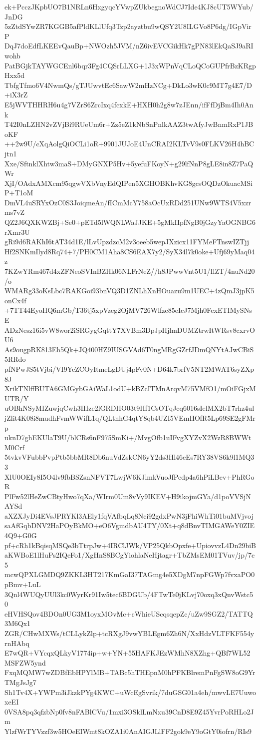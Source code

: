 ek+PcczJKpbUO7B1NRLn6HxgyqcYVwpZUkbegnoWdCJ7Ide4KJ8cUT5WYub/JnDG
5zZtdSYwZR7KGGB5afPldKLlUfq3Tzp2ayztbu9wQSY2U8ILGVo8P6dg/IGpVirP
DqJ7doEdfLKEEvQauBp+NWOzh5JVM/nZ6ivEVCGikHk7gPN83lEkQaSJ9aRIwohb
PatBGjkTAYWGCEnl6bqr3Fg4CQSrLLXG+1J3xWPnVqCLoQCoGUPfrBzKRgpHxx5d
TbfgTfmo6V4NwmQs/gTJUwvtEc6SawW2mHzNCg+DkLo3wK0c9MT7g4E7/D+iX3rZ
E5jWVTHHRH6u4g7VZrS6ZrcIxq4fcxkE+HXH0h2g8w7zJEnn/ifFfDjBm4Ih0Ank
T42I0nLZHN2vZVjBi9RUeUm6r+Zz5eZ1kNbSnPnlkAAZ3twAfyJwBnmRxP1JBoKF
++2w9U/cXqAolgQiOCLi1oR+9901JUJoE4UnCRAI2KLTvV9s0FLKV26H4hBCjtn1
Xxe/SftnklXhtw3maS+DMyGNXP5Hv+5yefuFKoyN+g29lfNnP8gLE8in8Z7PaQWr
XjI/OAdxAMXcm95qgwVXbVnyEdQIPen5XGHOBKhvKG8gcsOQDzOkuacMSiP+T1oM
DmVL4uSRYxOzC0S3JoiqmeAn/fICmMcY758aOcUxRDd251UNw9WTS4V5xzrms7vZ
QZ2J6QXKWZBj+Se0+pETd5lWQNLWaJJKE+5gMkIIpfNgB0jGzyYaOGNBG6rXmr3U
gRi9d6RAKhI6tAT34d1E/lLvUpzdzcM2v3oeeb5wepJXzicx11FYMeFTnswIZTjj
Hf2SNKmIlyd8Rq74+7/PH0CM1Aha8CS6EAX7y2/SyX34l7k0oke+Ufj69yMaq04z
7KZwYRm467d4xZFNeoSVInBZHk06NLFrNeZ//h8JPwwVnt5U1/IlZT/4nuNd20/o
WMARg33oKsLbc7RAKGoi93bnVQ3D1ZNLhXnHOuazu9m1UEC+4zQmJ3jpK5onCx4f
+7TT44EyoHQ6mGb/T36tj5xpVzeg2OjMV726Wlfze85eIcJ7Mjh0FexETIMySNsE
ADzNesz16i5vW8wor2iSRGygGqttY7XVBm3DpJpHjlmDUMZtrwItWRsv8cxrvOU6
As9ougpRK813Eh5Qk+JQ400HZ9IUSGVAd6T0ngMRgGZrfJDmQNYtAJwCBiS5RRdo
pfNPwJS5tVjbi/VI9YcZCOyItmeLgDUj4pFv0N+D64k7brfV5NT2MWAT6syZXp8J
XrikTNlffBUTA6GMGybGAiWaL1odU+kBZcITMnArqvM75VMfO1/mOiFGjxMUTR/Y
uOBhNSyMIZuwjqCwh3IHze2lGRDHO03t9Hf1CsOTqJcq6016sIelMX2bT7rhz4ul
jZlit4K08i8mudhFvmWWifL1q/QLtnhG4qtY8qb4UZI5VEmHOfR5Lp69SE2gFMrp
uknD7ghEKUlaT9U/blCRs6nF975SmKi+/MvgOfb1uIFvgXYZvX2WzR8BWWtM0Crf
5tvkvVFubbPvpPtb5bbMR8Db6nuVdZskCN6yY2ds3Hl46eEs7RY38VS6k9l1MQ33
XlU0OEIy8I5O4lv9fbBSZsnNFVT7LwjW6KJlmkVuoJfPedp4a6hPiLBev+PhRGoR
PlFw52lHeZwCBtyHwo7qXa/WIrm0Um8vVy9IKEV+H9ikojmGYa/d1poVVSjNAYSd
aXZXJyDi4EVsJPRYKl3AEly1fqVAfbqLq8Nci92gdxPwN3jFhiWhTi01buMVjvoj
saAfGqbDNV2HaPOyBkMO+eO6VgmdbAU4TY/0Xt+q8dBnvTIMGAWeY0ZIE4Q9+G0G
pf+cRh1kBqisqMSQe3bTtrpJw+4IRClJWk/VP25QkbOpxfe+UpiovvzL4Dn29biB
aKWBoE1lHuPs2IQeFo1/XgHnS8BCgYiohlaNeHjtagr+TbZMsEM01TVuv/jp/7c5
mcwQPXLGMDQ9ZKKL3HT217KmGaI37TAGmg4e5XDgM7npFGWp7fvxaPO0pBmv+LuL
3Qnl4WUQyUUl3kc0WyrKr91Iw5tec6BDGUb/4FTwTe0jKLvj70oxq3xQnvWstc50
eHVHSQov4BDOn0UG3M1oyxMOvMc+cWhieUScqsqepZc/uZw9SGZ2/TATTQ3M6Qx1
ZGR/CHwMXWs/tCLLykZlp+tcRXgJ9vwYBLEgm6Zh6N/XxHdzVLTFKF554yrnHAbq
E7wQR+VYcqxQLkyV1774ip+w+YN+55HAFKJEzWMhN8XZhg+QBf7WL52MSFZW5ynd
FxqMQMW7wZDBfEbHPYlMB+TABc5hTHEpnM0hPFKBlremPnFgSW8oG9YrTMgJsJg7
Sh1Tv4X+YWPm3iJkzkPYg4KWC+uWcEgSvrik/7duGSG01a4eh/mwvLE7UuwoxeEI
0VSA8pq3qfzbNp0fv8nFABlCVu/1mxi3OSklLmNxu39CnD8E9Z45YvrPoRHLo2Jm
YlzfWrTYVzzf3w5HOeEIWmt8kOZA1i0AnAIGJLlFF2gok9eY9oGtY0iofrn/RIs9
